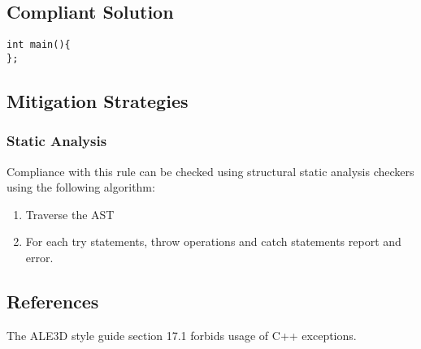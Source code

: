 \subsection{Compliant Solution}


\begin{verbatim}
int main(){
};
\end{verbatim}

\subsection{Mitigation Strategies}
\subsubsection{Static Analysis} 

Compliance with this rule can be checked using structural static analysis checkers using the following algorithm:

\begin{enumerate}
\item Traverse the AST
\item For each try statements, throw operations and catch statements report and error.
\end{enumerate}

\subsection{References}
The ALE3D style guide section 17.1 forbids usage of C++ exceptions.

